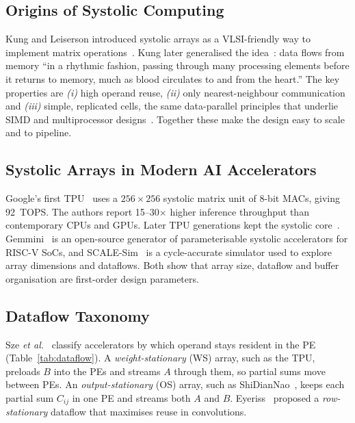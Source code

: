 \documentclass[conference]{IEEEtran}
\begin{document}
\subsection{Origins of Systolic Computing}
Kung and Leiserson introduced systolic arrays as a VLSI-friendly way to
implement matrix operations~\cite{kung1979systolic}. Kung later
generalised the idea~\cite{kung1982why}: data flows from memory ``in a
rhythmic fashion, passing through many processing elements before it
returns to memory, much as blood circulates to and from the heart.'' The key
properties are \emph{(i)} high operand reuse, \emph{(ii)} only
nearest-neighbour communication and \emph{(iii)} simple, replicated cells, the same data-parallel principles that underlie SIMD and multiprocessor designs~\cite{culler_pca}.
Together these make the design easy to scale and to pipeline.

\subsection{Systolic Arrays in Modern AI Accelerators}
Google's first TPU~\cite{jouppi2017tpu} uses a $256\times256$ systolic
matrix unit of 8-bit MACs, giving 92~TOPS. The authors report 15--30$\times$
higher inference throughput than contemporary CPUs and GPUs. Later TPU
generations kept the systolic core~\cite{jouppi2021tpuv4i}.
Gemmini~\cite{genc2021gemmini} is an open-source generator of
parameterisable systolic accelerators for RISC-V SoCs, and
SCALE-Sim~\cite{samajdar2018scalesim} is a cycle-accurate simulator used to
explore array dimensions and dataflows. Both show that array size, dataflow
and buffer organisation are first-order design parameters.

\subsection{Dataflow Taxonomy}
Sze \emph{et al.}~\cite{sze2017efficient} classify accelerators by which
operand stays resident in the PE (Table~\ref{tab:dataflow}).
A \emph{weight-stationary} (WS) array, such as the TPU, preloads $B$ into the PEs and
streams $A$ through them, so partial sums move between PEs.
An \emph{output-stationary} (OS) array, such as ShiDianNao~\cite{du2015shidiannao}, keeps each
partial sum $C_{ij}$ in one PE and streams both $A$ and $B$.
Eyeriss~\cite{chen2017eyeriss} proposed a \emph{row-stationary} dataflow
that maximises reuse in convolutions.
\end{document}
